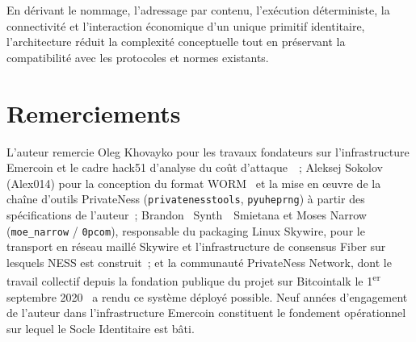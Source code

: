 \documentclass[11pt,a4paper]{article}
\begin{document}
En dérivant le nommage, l'adressage par contenu, l'exécution déterministe, la
connectivité et l'interaction économique d'un unique primitif identitaire,
l'architecture réduit la complexité conceptuelle tout en préservant la
compatibilité avec les protocoles et normes existants.

\section*{Remerciements}

L'auteur remercie Oleg Khovayko pour les travaux fondateurs sur l'infrastructure
Emercoin et le cadre hack51 d'analyse du coût d'attaque~\cite{hack51}~;
Aleksej Sokolov (Alex014) pour la conception du format WORM~\cite{worm} et la
mise en \oe{}uvre de la chaîne d'outils PrivateNess (\texttt{privatenesstools},
\texttt{pyuheprng}) à partir des spécifications de l'auteur~; Brandon
\og~Synth~\fg~Smietana et Moses Narrow (\texttt{moe\_narrow} /
\texttt{0pcom}), responsable du packaging Linux Skywire, pour le transport en
réseau maillé Skywire et l'infrastructure de consensus Fiber sur lesquels NESS
est construit~; et la communauté PrivateNess Network, dont le travail collectif
depuis la fondation publique du projet sur Bitcointalk le 1\textsuperscript{er}
septembre 2020~\cite{bitcointalk} a rendu ce système déployé possible.  Neuf
années d'engagement de l'auteur dans l'infrastructure Emercoin constituent le
fondement opérationnel sur lequel le Socle Identitaire est bâti.
\end{document}
